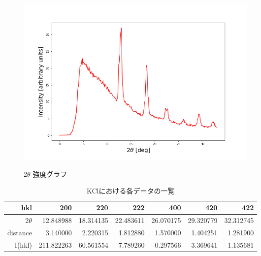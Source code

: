\documentclass[a4paper,12pt]{jarticle}
\begin{document}
   \begin{figure}[htbp]
    \begin{center}
     \includegraphics[clip,width=12.0cm]{KCL_plot.png}
     \label{fig:KCl_plot}
     \caption{2$\theta$-強度グラフ}
    \end{center}
   \end{figure}

   \begin{table}[htbp]
    \begin{center}

       \caption{KClにおける各データの一覧}
        \begin{tabular}{|r|r|r|r|r|r|r|}
         \hline
                 hkl   &     200   &     220   &       222 &       400 &       420 &      422 \\
         \hline
			2$\theta$  & 12.848988 & 18.314135 & 22.483611 & 26.070175 & 29.320779 & 32.312745 \\
			distance   &  3.140000 &  2.220315 &  1.812880 &  1.570000 &  1.404251 &  1.281900\\
			I(hkl)   &  211.822263 & 60.561554 &  7.789260 &  0.297566 &  3.369641 &  1.135681\\
         \hline

         \hline
        \end{tabular}
       \label{table:KCl}

      \end{center}
     \end{table}
     
\end{document}
